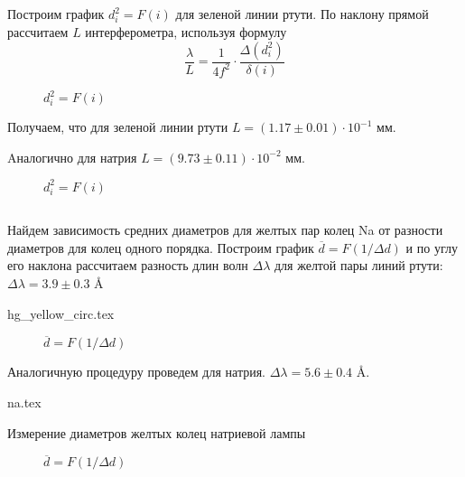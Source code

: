 \subsection{}
Построим график $d^2_i = F(i)$ для зеленой линии ртути. По наклону прямой
рассчитаем $L$ интерферометра, используя формулу
$$
\frac{\lambda}{L} = \frac{1}{4f^2} \cdot \frac{\Delta (d^2_i)}{\delta (i)}
$$

\begin{figure}[h!]
  \caption{$d^2_i = F(i)$}
  \label{img::di_hg}
\end{figure}

Получаем, что для зеленой линии ртути $L = (1.17 \pm 0.01) \cdot 10^{-1}$ мм.

Aналогично для натрия $L = (9.73 \pm 0.11) \cdot 10^{-2}$ мм.

\newpage

\begin{figure}[h!]
  \caption{$d^2_i = F(i)$}
  \label{img::di_na}
\end{figure}

\newpage
\subsection{}

Найдем зависимость средних диаметров для желтых пар колец Na от разности диаметров
для колец одного порядка. Построим график $\overline{d} = F(1/\Delta d)$ и по
углу его наклона рассчитаем разность длин волн $\Delta \lambda$ для желтой пары
линий ртути: $\Delta \lambda = 3.9 \pm 0.3$ \AA

{hg_yellow_circ.tex}

\begin{figure}[h!]
  \caption{$\overline{d} = F(1/\Delta d)$}
  \label{img::avg_diam_hg}
\end{figure}

\newpage

Аналогичную процедуру проведем для натрия. $\Delta \lambda = 5.6 \pm 0.4$ \AA.

\begin{table}[h!]
  \begin{center}
    {na.tex}
  \end{center}
  \caption{Измерение диаметров желтых колец натриевой лампы}
\end{table}

\begin{figure}[h!]
  \caption{$\overline{d} = F(1/\Delta d)$}
  \label{img::avg_diam_na}
\end{figure}

\newpage

\subsection{}




